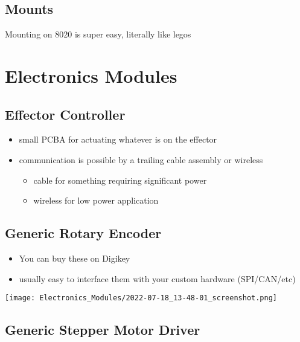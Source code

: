 \documentclass[11pt]{article}
\begin{document}
\subsection{Mounts}
\label{sec:org73a3129}

Mounting on 8020 is super easy, literally like legos

\section{Electronics Modules}
\label{sec:orgd08b5fd}

\subsection{Effector Controller}
\label{sec:orgffa7b49}

\begin{itemize}
\item small PCBA for actuating whatever is on the effector
\item communication is possible by a trailing cable assembly or wireless
\begin{itemize}
\item cable for something requiring significant power
\item wireless for low power application
\end{itemize}
\end{itemize}

\subsection{Generic Rotary Encoder}
\label{sec:org4b67f29}

\begin{itemize}
\item You can buy these on Digikey
\item usually easy to interface them with your custom hardware (SPI/CAN/etc)
\end{itemize}

\begin{center}
\texttt{[image: Electronics\_Modules/2022-07-18\_13-48-01\_screenshot.png]}
\end{center}

\subsection{Generic Stepper Motor Driver}
\label{sec:org14f281b}
\end{document}
